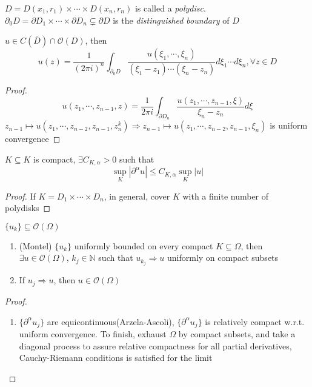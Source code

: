 \documentclass[../main.tex]{subfiles}
\begin{document}
\begin{definition}
$D=D(x_1,r_1)\times\cdots\times D(x_n,r_n)$ is called a \textit{polydisc}. $\partial_0D=\partial D_1\times\cdots\times\partial D_n\subsetneq\partial D$ is the \textit{distinguished boundary} of $D$
\end{definition}

\begin{theorem}
$u\in C(\overline D)\cap\mathcal O(D)$, then
\[u(z)=\frac{1}{(2\pi i)^n}\int_{\partial_0D}\frac{u(\xi_1,\cdots,\xi_n)}{(\xi_1-z_1)\cdots(\xi_n-z_n)}d\xi_1\cdots d\xi_n, \forall z\in D\]
\end{theorem}

\begin{proof}
\[u(z_1,\cdots,z_{n-1},z)=\frac{1}{2\pi i}\int_{\partial D_n}\frac{u(z_1,\cdots,z_{n-1},\xi)}{\xi_n-z_n}d\xi\]
$z_{n-1}\mapsto u(z_1,\cdots,z_{n-2},z_{n-1},z_n^k)\Rightarrow z_{n-1}\mapsto u(z_1,\cdots,z_{n-2},z_{n-1},\xi_n)$ is uniform convergence
\end{proof}

\begin{theorem}
$K\subseteq K$ is compact, $\exists C_{K,\alpha}>0$ such that
\[\sup_K|\partial^\alpha u|\leq C_{K,\alpha}\sup_{K}|u|\]
\end{theorem}

\begin{proof}
If $K=D_1\times\cdots\times D_n$, in general, cover $K$ with a finite number of polydisks
\end{proof}

\begin{corollary}
$\{u_k\}\subseteq\mathcal O(\Omega)$
\begin{enumerate}
\item (Montel) $\{u_k\}$ uniformly bounded on every compact $K\subseteq \Omega$, then $\exists u\in\mathcal O(\Omega)$, $k_j\in\mathbb N$ such that $u_{k_j}\Rightarrow u$ uniformly on compact subsets
\item If $u_j\Rightarrow u$, then $u\in\mathcal O(\Omega)$
\end{enumerate}
\end{corollary}

\begin{proof}
\begin{enumerate}
\item $\{\partial^\alpha u_j\}$ are equicontinuous(Arzela-Ascoli), $\{\partial^\alpha u_j\}$ is relatively compact w.r.t. uniform convergence. To finish, exhaust $\Omega$ by compact subsets, and take a diagonal process to assure relative compactness for all partial derivatives, Cauchy-Riemann conditions is satisfied for the limit
\end{enumerate}
\end{proof}
\end{document}
